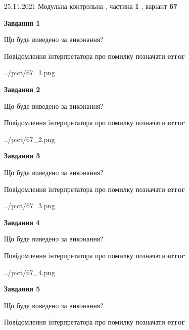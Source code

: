 \documentclass[10pt, ukrainian]{article}
\begin{document}
{25.11.2021 Модульна контрольна , частина \textbf { 1 }, варіант  \No \textbf { 67 }\par}
{
\begin {large}

{\begin {center}\textbf{Завдання 1}\end {center}}\par
Що буде виведено за виконання? \par
Повідомлення інтерпретатора про помилку позначати \textbf{error}

\begin{center}
	{../pict/67_1.png}
\end{center}
\newpage

{\begin {center}\textbf{Завдання 2}\end {center}}\par
Що буде виведено за виконання? \par
Повідомлення інтерпретатора про помилку позначати \textbf{error}

\begin{center}
	{../pict/67_2.png}
\end{center}
\newpage

{\begin {center}\textbf{Завдання 3}\end {center}}\par
Що буде виведено за виконання? \par
Повідомлення інтерпретатора про помилку позначати \textbf{error}

\begin{center}
	{../pict/67_3.png}
\end{center}
\newpage

{\begin {center}\textbf{Завдання 4}\end {center}}\par
Що буде виведено за виконання? \par
Повідомлення інтерпретатора про помилку позначати \textbf{error}

\begin{center}
	{../pict/67_4.png}
\end{center}
\newpage

{\begin {center}\textbf{Завдання 5}\end {center}}\par
Що буде виведено за виконання? \par
Повідомлення інтерпретатора про помилку позначати \textbf{error}


\end{large}}
\end{document}
